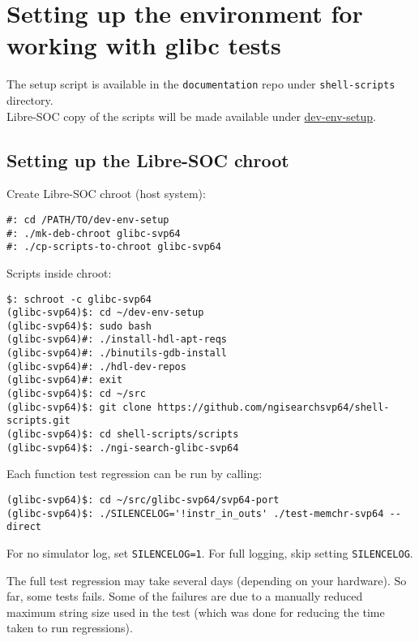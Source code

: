 %

\chapter{Setting up the environment for working with glibc tests}

The setup script is available in the \texttt{documentation} repo
under \texttt{shell-scripts} directory.\\

Libre-SOC copy of the scripts will be made available under
\href{https://git.libre-soc.org/?p=dev-env-setup.git;a=tree}{dev-env-setup}.

\section{Setting up the Libre-SOC chroot}

Create Libre-SOC chroot (host system):

\begin{verbatim}
#: cd /PATH/TO/dev-env-setup
#: ./mk-deb-chroot glibc-svp64
#: ./cp-scripts-to-chroot glibc-svp64
\end{verbatim}

Scripts inside chroot:

\begin{verbatim}
$: schroot -c glibc-svp64
(glibc-svp64)$: cd ~/dev-env-setup
(glibc-svp64)$: sudo bash
(glibc-svp64)#: ./install-hdl-apt-reqs
(glibc-svp64)#: ./binutils-gdb-install
(glibc-svp64)#: ./hdl-dev-repos
(glibc-svp64)#: exit
(glibc-svp64)$: cd ~/src
(glibc-svp64)$: git clone https://github.com/ngisearchsvp64/shell-scripts.git
(glibc-svp64)$: cd shell-scripts/scripts
(glibc-svp64)$: ./ngi-search-glibc-svp64
\end{verbatim}

Each function test regression can be run by calling:

\begin{verbatim}
(glibc-svp64)$: cd ~/src/glibc-svp64/svp64-port
(glibc-svp64)$: ./SILENCELOG='!instr_in_outs' ./test-memchr-svp64 --direct
\end{verbatim}

For no simulator log, set \texttt{SILENCELOG=1}.
For full logging, skip setting \texttt{SILENCELOG}.

The full test regression may take several days (depending on your hardware).
So far, some tests fails. Some of the failures are due to a manually reduced
maximum string size used in the test (which was done for reducing the time
taken to run regressions).\\

